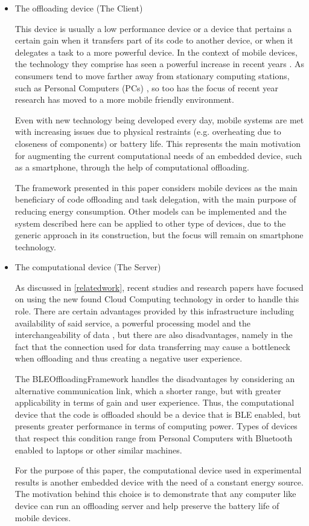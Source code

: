 \begin{itemize}

\item{The offloading device (The Client)}

	This device is usually a low performance device or a device that pertains a certain gain when it transfers part of its code to another device, or when it delegates a task to a more powerful device. In the context of mobile devices, the technology they comprise has seen a powerful increase in recent years \cite{abolfazli2012mobile}. As consumers tend to move farther away from stationary computing stations, such as Personal Computers (PCs)  \cite{gartnerforecast}, so too has the focus of recent year research has moved to a more mobile friendly environment. 
	
	Even with new technology being developed every day, mobile systems are met with increasing issues due to physical restraints (e.g. overheating due to closeness of components) or battery life. This represents the main motivation for augmenting the current computational needs of an embedded device, such as a smartphone, through the help of computational offloading.
	
	The framework presented in this paper considers mobile devices as the main beneficiary of code offloading and task delegation, with the main purpose of reducing energy consumption. Other models can be implemented and the system described here can be applied to other type of devices, due to the generic approach in its construction, but the focus will remain on smartphone technology.

\item{The computational device (The Server)}

	As discussed in \ref{relatedwork}, recent studies and research papers have focused on using the new found Cloud Computing technology in order to handle this role. There are certain advantages provided by this infrastructure including availability of said service, a powerful processing model and the interchangeability of data \cite{kumar2010cloud}, but there are also disadvantages, namely in the fact that the connection used for data transferring may cause a bottleneck when offloading and thus creating a negative user experience.
	
	The BLEOffloadingFramework handles the disadvantages by considering an alternative communication link, which a shorter range, but with greater applicability in terms of gain and user experience. Thus, the computational device that the code is offloaded should be a device that is BLE enabled, but presents greater performance in terms of computing power. Types of devices that respect this condition range from Personal Computers with Bluetooth enabled to laptops or other similar machines.
	
	For the purpose of this paper, the computational device used in experimental results is another embedded device with the need of a constant energy source. The motivation behind this choice is to demonstrate that any computer like device can run an offloading server and help preserve the battery life of mobile devices.

\end{itemize}


